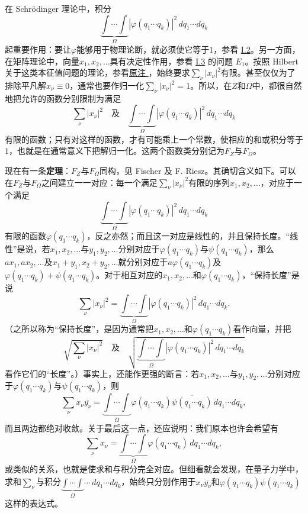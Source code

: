 \documentclass[fontsize=13pt,twoside,openany,headings=normal,parskip=false,bookmarkpackage=false,DIV=calc]{scrbook}
\begin{document}
在 Schrödinger 理论中，积分
\[
 \underbrace{\int\cdots\int}_{\Omega}|\varphi(q_1\cdots q_k)|^2\,dq_1\cdots dq_k
\]
起重要作用：要让$\varphi$能够用于物理论断，就必须使它等于$1$，参看 \hyperref[sec:I.2]{I.2}。另一方面，在矩阵理论中，向量$x_1,\allowbreak x_2,\allowbreak \ldots$具有决定性作用，参看 \hyperref[sec:I.3]{I.3} 的问题 \hyperref[eq:I.3.E1]{$E_1$}。按照 Hilbert 关于这类本征值问题的理论，参看\CJKglue \hyperlink{note-30}{原注 }，始终要求$\sum_\nu|x_\nu|^2$有限。甚至仅仅为了排除平凡解$x_\nu\equiv0$，通常也要作归一化$\sum_\nu|x_\nu|^2=1$。所以，在$Z$和$\Omega$中，都很自然地把允许的函数分别限制为满足
\[
 \sum_\nu|x_\nu|^2
 \quad\text{及}\quad
 \underbrace{\int\cdots\int}_{\Omega}|\varphi(q_1\cdots q_k)|^2\,dq_1\cdots dq_k
\]
有限的函数；只有对这样的函数，才有可能乘上一个常数，使相应的和或积分等于$1$，也就是在通常意义下把解归一化。这两个函数类分别记为$F_Z$与$F_\Omega$。

现在有一条\textbf{定理}：$F_Z$与$F_\Omega$同构，见 Fischer 及 F. Riesz。其确切含义如下。可以在$F_Z$与$F_\Omega$之间建立一一对应：每一个满足$\sum_\nu|x_\nu|^2$有限的序列$x_1,\allowbreak x_2,\allowbreak \ldots$，对应于一个满足
\[
 \underbrace{\int\cdots\int}_{\Omega}|\varphi(q_1\cdots q_k)|^2\,dq_1\cdots dq_k
\]
有限的函数$\varphi(q_1\cdots q_k)$，反之亦然；而且这一对应是线性的，并且保持长度。“线性”是说，若$x_1,\allowbreak x_2,\allowbreak \ldots$与$y_1,\allowbreak y_2,\allowbreak \ldots$分别对应于$\varphi(q_1\cdots q_k)$与$\psi(q_1\cdots q_k)$，那么$ax_1,\allowbreak ax_2,\allowbreak \ldots$及$x_1+y_1,\allowbreak x_2+y_2,\allowbreak \ldots$就分别对应于$a\varphi(q_1\cdots q_k)$及$\varphi(q_1\cdots q_k)+\psi(q_1\cdots q_k)$。对于相互对应的$x_1,\allowbreak x_2,\allowbreak \ldots$和$\varphi(q_1\cdots q_k)$，“保持长度”是说
\[
 \sum_\nu|x_\nu|^2
 =\underbrace{\int\cdots\int}_{\Omega}|\varphi(q_1\cdots q_k)|^2\,dq_1\cdots dq_k.
\]
（之所以称为“保持长度”，是因为通常把$x_1,\allowbreak x_2,\allowbreak \ldots$和$\varphi(q_1\cdots q_k)$看作向量，并把
\[
 \sqrt{\sum_\nu|x_\nu|^2}
 \quad\text{及}\quad
 \sqrt{\underbrace{\int\cdots\int}_{\Omega}|\varphi(q_1\cdots q_k)|^2\,dq_1\cdots dq_k}
\]
看作它们的“长度”。）事实上，还能作更强的断言：若$x_1,\allowbreak x_2,\allowbreak \ldots$与$y_1,\allowbreak y_2,\allowbreak \ldots$分别对应于$\varphi(q_1\cdots q_k)$与$\psi(q_1\cdots q_k)$，则
\[
 \sum_\nu x_\nu\overline{y_\nu}
 =\underbrace{\int\cdots\int}_{\Omega}\varphi(q_1\cdots q_k)
 \overline{\psi(q_1\cdots q_k)}\,dq_1\cdots dq_k,
\]\hypertarget{origpage-17}{}\label{origpage-17}而且两边都绝对收敛。关于最后这一点，还应说明：我们原本也许会希望有
\[
 \sum_\nu x_\nu=\underbrace{\int\cdots\int}_{\Omega}\varphi(q_1\cdots q_k)\,dq_1\cdots dq_k,
\]
或类似的关系，也就是使求和与积分完全对应。但细看就会发现，在量子力学中，求和$\sum_\nu$与积分$\underbrace{\int\cdots\int}_{\Omega}\cdots\,dq_1\cdots dq_k$，始终只分别作用于$x_\nu\overline{y_\nu}$和$\varphi(q_1\cdots q_k)\overline{\psi(q_1\cdots q_k)}$这样的表达式。
\end{document}
